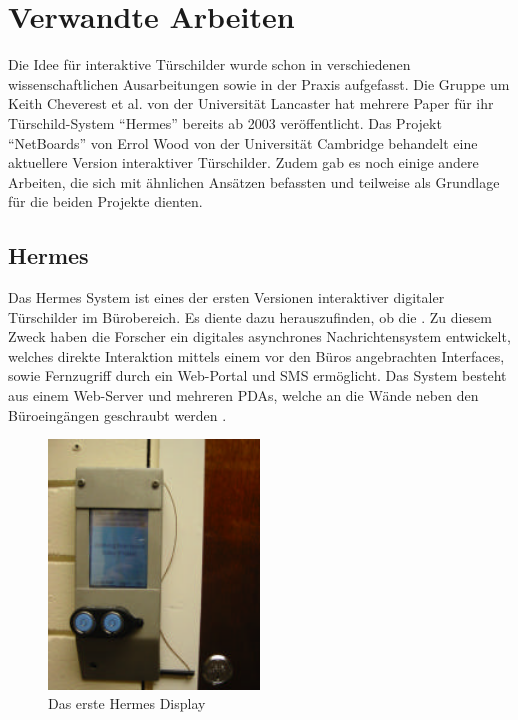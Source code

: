 \chapter{Verwandte Arbeiten}
Die Idee für interaktive Türschilder wurde schon in verschiedenen wissenschaftlichen Ausarbeitungen sowie in der Praxis aufgefasst.
Die Gruppe um Keith Cheverest et al. von der Universität Lancaster hat mehrere Paper für ihr Türschild-System ``Hermes''\cite{cheverest:2003:paper} bereits ab 2003 veröffentlicht.
Das Projekt ``NetBoards'' von Errol Wood\cite{wood:2014} von der Universität Cambridge behandelt eine aktuellere Version interaktiver Türschilder.
Zudem gab es noch einige andere Arbeiten, die sich mit ähnlichen Ansätzen befassten und teilweise als Grundlage für die beiden Projekte dienten.

\section{Hermes}
Das Hermes System\cite{cheverest:2003:paper,cheverest:2003:article,cheveres:2005:hermes-bluetooth} ist eines der ersten Versionen interaktiver digitaler Türschilder im Bürobereich.
Es diente dazu herauszufinden, ob die .
Zu diesem Zweck haben die Forscher ein digitales asynchrones Nachrichtensystem entwickelt, welches direkte Interaktion mittels einem vor den Büros angebrachten Interfaces, sowie Fernzugriff durch ein Web-Portal und SMS ermöglicht.
Das System besteht aus einem Web-Server und mehreren PDAs, welche an die Wände neben den Büroeingängen geschraubt werden .
\begin{figure}[h!]
  \centering
  \includegraphics[width=0.5\textwidth]{./img/hermes_display.png}
  \caption{Das erste Hermes Display\cite{cheverest:2003:paper}}
  \label{img:hermesDisplay}
\end{figure}
